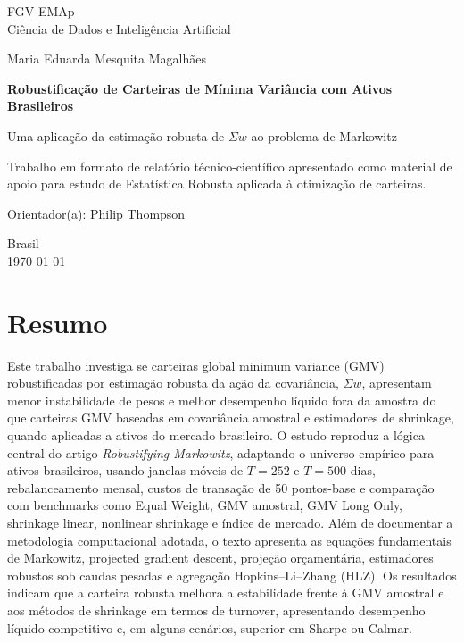 \documentclass[12pt,a4paper]{article}
\newcommand{\instituicao}{FGV EMAp}
\newcommand{\curso}{Ciência de Dados e Inteligência Artificial}
\newcommand{\autor}{Maria Eduarda Mesquita Magalhães}
\newcommand{\orientador}{Philip Thompson}
\newcommand{\titulo}{Robustificação de Carteiras de Mínima Variância com Ativos Brasileiros}
\newcommand{\subtitulo}{Uma aplicação da estimação robusta de $\Sigma w$ ao problema de Markowitz}
\begin{document}

\begin{titlepage}
  \begin{center}
    \instituicao\\
    \curso

    \vfill

    {\large \autor}

    \vfill

    {\Large\bfseries \titulo\par}
    \vspace{0.5cm}
    {\large \subtitulo\par}

    \vfill

    \begin{flushright}
      \begin{minipage}{0.52\textwidth}
        Trabalho em formato de relatório técnico-científico apresentado como material de
        apoio para estudo de Estatística Robusta aplicada à otimização de carteiras.

        \vspace{0.4cm}
        Orientador(a): \orientador
      \end{minipage}
    \end{flushright}

    \vfill

    Brasil\\
    \today
  \end{center}
\end{titlepage}


\section*{Resumo}
Este trabalho investiga se carteiras global minimum variance (GMV) robustificadas por
estimação robusta da ação da covariância, $\Sigma w$, apresentam menor instabilidade de pesos
e melhor desempenho líquido fora da amostra do que carteiras GMV baseadas em covariância
amostral e estimadores de shrinkage, quando aplicadas a ativos do mercado brasileiro. O estudo
reproduz a lógica central do artigo \emph{Robustifying Markowitz}, adaptando o universo
empírico para ativos brasileiros, usando janelas móveis de $T=252$ e $T=500$ dias,
rebalanceamento mensal, custos de transação de 50 pontos-base e comparação com benchmarks
como Equal Weight, GMV amostral, GMV Long Only, shrinkage linear, nonlinear shrinkage e índice
de mercado. Além de documentar a metodologia computacional adotada, o texto apresenta as
equações fundamentais de Markowitz, projected gradient descent, projeção
orçamentária, estimadores robustos sob caudas pesadas e agregação Hopkins--Li--Zhang (HLZ). Os
resultados indicam que a carteira robusta melhora a estabilidade frente à GMV amostral e aos
métodos de shrinkage em termos de turnover, apresentando desempenho líquido competitivo e, em
alguns cenários, superior em Sharpe ou Calmar.
\end{document}
